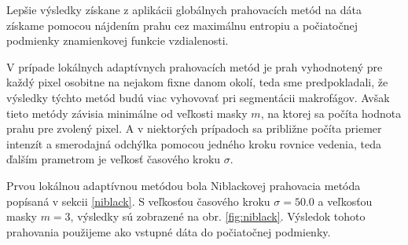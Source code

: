 \documentclass[a4paper,11pt,oneside]{article}%
\begin{document}
Lepšie výsledky získane z aplikácii globálnych prahovacích metód na dáta získame pomocou nájdením prahu cez maximálnu entropiu a počiatočnej podmienky znamienkovej funkcie vzdialenosti.

V prípade lokálnych adaptívnych prahovacích metód je prah vyhodnotený pre každý pixel osobitne na nejakom fixne danom okolí, teda sme predpokladali, že výsledky týchto metód budú viac vyhovovať pri segmentácii makrofágov. Avšak tieto metódy závisia minimálne od veľkosti masky $m$, na ktorej sa počíta hodnota prahu pre zvolený pixel. A v niektorých prípadoch sa približne počíta priemer intenzít a smerodajná odchýlka pomocou jedného kroku rovnice vedenia, teda ďalším prametrom je veľkosť časového kroku $\sigma$. 

Prvou lokálnou adaptívnou metódou bola Niblackovej prahovacia metóda popísaná v sekcii \ref{niblack}.  S veľkosťou časového kroku $\sigma = 50.0$ a veľkosťou masky $m = 3$, výsledky sú zobrazené na obr. \ref{fig:niblack}. Výsledok tohoto prahovania použijeme ako vstupné dáta do počiatočnej podmienky.
\end{document}
